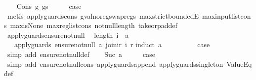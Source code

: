 \begin{isabellebody}
\isamarkupfalse%
\isanewline
\ \ \isamarkupfalse%
\ {\isacharparenleft}Cons\ g\ gs{\isacharparenright}\isanewline
\ \ \isamarkupfalse%
\ \isamarkupfalse%
\ {\isacharquery}case\isanewline
\ \ \ \ \isamarkupfalse%
\ {\isacharparenleft}metis\ apply{\isacharunderscore}guards{\isacharunderscore}cons\ gval{\isacharunderscore}no{\isacharunderscore}reg{\isacharunderscore}swap{\isacharunderscore}regs\ max{\isachardot}strict{\isacharunderscore}boundedE\ max{\isacharunderscore}input{\isacharunderscore}list{\isacharunderscore}cons\ max{\isacharunderscore}is{\isacharunderscore}None\ max{\isacharunderscore}reg{\isacharunderscore}list{\isacharunderscore}cons\ not{\isacharunderscore}null{\isacharunderscore}length\ take{\isacharunderscore}or{\isacharunderscore}pad{\isacharunderscore}def{\isacharparenright}\isanewline
{}\isamarkupfalse%
%
\endisatagproof
{\isafoldproof}%
%
\isadelimproof
\isanewline
%
\endisadelimproof
\isanewline
{}\isamarkupfalse%
\ apply{\isacharunderscore}guards{\isacharunderscore}ensure{\isacharunderscore}not{\isacharunderscore}null{\isacharcolon}\isanewline
\ \ {\isachardoublequoteopen}length\ i\ {\isasymge}\ a\ {\isasymLongrightarrow}\isanewline
\ \ \ apply{\isacharunderscore}guards\ {\isacharparenleft}ensure{\isacharunderscore}not{\isacharunderscore}null\ a{\isacharparenright}\ {\isacharparenleft}join{\isacharunderscore}ir\ i\ r{\isacharparenright}{\isachardoublequoteclose}\isanewline
%
\isadelimproof
%
\endisadelimproof
%
\isatagproof
{}\isamarkupfalse%
{\isacharparenleft}induct\ a{\isacharparenright}\isanewline
\ \ \isamarkupfalse%
\ {}\isanewline
\ \ \isamarkupfalse%
\ \isamarkupfalse%
\ {\isacharquery}case\isanewline
\ \ \ \ \isamarkupfalse%
\ {\isacharparenleft}simp\ add{\isacharcolon}\ ensure{\isacharunderscore}not{\isacharunderscore}null{\isacharunderscore}def{\isacharparenright}\isanewline
{}\isamarkupfalse%
\isanewline
\ \ \isamarkupfalse%
\ {\isacharparenleft}Suc\ a{\isacharparenright}\isanewline
\ \ \isamarkupfalse%
\ \isamarkupfalse%
\ {\isacharquery}case\isanewline
\ \ \ \ \isamarkupfalse%
\ {\isacharparenleft}simp\ add{\isacharcolon}\ ensure{\isacharunderscore}not{\isacharunderscore}null{\isacharunderscore}cons\ apply{\isacharunderscore}guards{\isacharunderscore}append\ apply{\isacharunderscore}guards{\isacharunderscore}singleton\ ValueEq{\isacharunderscore}def{\isacharparenright}\isanewline

\end{isabellebody}

